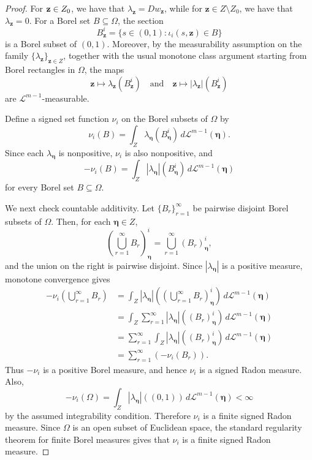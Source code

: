 \documentclass{publicadapt}
\begin{document}
\begin{proof}
  For $ \text{{\bf z}} \in Z_0$, we have
  that \(\lambda_{\mathbf z}=Dw_{\mathbf z}\), while for
\(\mathbf z\in Z\setminus Z_0\), we have that \(\lambda_{\mathbf z}=0\).
 For a Borel set
$B \subseteq\Omega$, the section
\[
B_{\mathbf z}^{i}
=
\{s\in(0,1):\iota_i(s,\mathbf z)\in B\}
\]
is a Borel subset of \((0,1)\). Moreover, by the measurability assumption on
the family \(\{\lambda_{\mathbf z}\}_{\mathbf z\in Z}\), together with the
usual monotone class argument starting from Borel rectangles in \(\Omega\), the
maps
\[
\mathbf z\mapsto \lambda_{\mathbf z}(B_{\mathbf z}^{i})
\quad\text{and}\quad
\mathbf z\mapsto |\lambda_{\mathbf z}|(B_{\mathbf z}^{i})
\]
are \(\mathcal L^{m-1}\)-measurable.

Define a signed set function \(\nu_i\) on the Borel subsets of \(\Omega\) by
\[
\nu_i(B)
=
\int_Z
\lambda_{\boldsymbol\eta}(B_{\boldsymbol\eta}^{i})
\,d\mathcal L^{m-1}(\boldsymbol\eta).
\]
Since each \(\lambda_{\boldsymbol\eta}\) is nonpositive, \(\nu_i\) is also
nonpositive, and
\[
-\nu_i(B)
=
\int_Z
|\lambda_{\boldsymbol\eta}|(B_{\boldsymbol\eta}^{i})
\,d\mathcal L^{m-1}(\boldsymbol\eta)
\]
for every Borel set \(B\subseteq\Omega\).

We next check countable additivity. Let \(\{B_r\}_{r=1}^{\infty}\) be pairwise
disjoint Borel subsets of \(\Omega\). Then, for each
\(\boldsymbol\eta\in Z\),
\[
\left(\bigcup_{r=1}^{\infty}B_r\right)_{\boldsymbol\eta}^{i}
=
\bigcup_{r=1}^{\infty}(B_r)_{\boldsymbol\eta}^{i},
\]
and the union on the right is pairwise disjoint. Since
\(|\lambda_{\boldsymbol\eta}|\) is a positive measure, monotone convergence
gives
\[
\begin{aligned}
-\nu_i\left(\bigcup_{r=1}^{\infty}B_r\right)
&=
\int_Z
|\lambda_{\boldsymbol\eta}|
\left(
\left(\bigcup_{r=1}^{\infty}B_r\right)_{\boldsymbol\eta}^{i}
\right)
\,d\mathcal L^{m-1}(\boldsymbol\eta) \\[4pt]
&=
\int_Z
\sum_{r=1}^{\infty}
|\lambda_{\boldsymbol\eta}|((B_r)_{\boldsymbol\eta}^{i})
\,d\mathcal L^{m-1}(\boldsymbol\eta) \\[4pt]
&=
\sum_{r=1}^{\infty}
\int_Z
|\lambda_{\boldsymbol\eta}|((B_r)_{\boldsymbol\eta}^{i})
\,d\mathcal L^{m-1}(\boldsymbol\eta) \\[4pt]
&=
\sum_{r=1}^{\infty}(-\nu_i(B_r)).
\end{aligned}
\]
Thus \(-\nu_i\) is a positive Borel measure, and hence \(\nu_i\) is a signed
 Radon measure. Also,
\[
-\nu_i(\Omega)
=
\int_Z
|\lambda_{\boldsymbol\eta}|((0,1))
\,d\mathcal L^{m-1}(\boldsymbol\eta)
<\infty
\]
by the assumed integrability condition. Therefore \(\nu_i\) is a finite signed
 Radon measure. Since \(\Omega\) is an open subset of Euclidean space, the
standard regularity theorem for finite Borel measures gives that \(\nu_i\) is a
finite signed Radon measure.


\end{proof}
\end{document}
